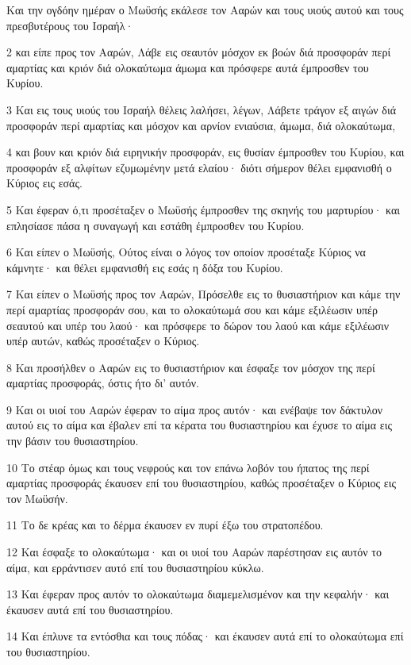 \par Και την ογδόην ημέραν ο Μωϋσής εκάλεσε τον Ααρών και τους υιούς αυτού και τους πρεσβυτέρους του Ισραήλ·
\par 2 και είπε προς τον Ααρών, Λάβε εις σεαυτόν μόσχον εκ βοών διά προσφοράν περί αμαρτίας και κριόν διά ολοκαύτωμα άμωμα και πρόσφερε αυτά έμπροσθεν του Κυρίου.
\par 3 Και εις τους υιούς του Ισραήλ θέλεις λαλήσει, λέγων, Λάβετε τράγον εξ αιγών διά προσφοράν περί αμαρτίας και μόσχον και αρνίον ενιαύσια, άμωμα, διά ολοκαύτωμα,
\par 4 και βουν και κριόν διά ειρηνικήν προσφοράν, εις θυσίαν έμπροσθεν του Κυρίου, και προσφοράν εξ αλφίτων εζυμωμένην μετά ελαίου· διότι σήμερον θέλει εμφανισθή ο Κύριος εις εσάς.
\par 5 Και έφεραν ό,τι προσέταξεν ο Μωϋσής έμπροσθεν της σκηνής του μαρτυρίου· και επλησίασε πάσα η συναγωγή και εστάθη έμπροσθεν του Κυρίου.
\par 6 Και είπεν ο Μωϋσής, Ούτος είναι ο λόγος τον οποίον προσέταξε Κύριος να κάμνητε· και θέλει εμφανισθή εις εσάς η δόξα του Κυρίου.
\par 7 Και είπεν ο Μωϋσής προς τον Ααρών, Πρόσελθε εις το θυσιαστήριον και κάμε την περί αμαρτίας προσφοράν σου, και το ολοκαύτωμά σου και κάμε εξιλέωσιν υπέρ σεαυτού και υπέρ του λαού· και πρόσφερε το δώρον του λαού και κάμε εξιλέωσιν υπέρ αυτών, καθώς προσέταξεν ο Κύριος.
\par 8 Και προσήλθεν ο Ααρών εις το θυσιαστήριον και έσφαξε τον μόσχον της περί αμαρτίας προσφοράς, όστις ήτο δι' αυτόν.
\par 9 Και οι υιοί του Ααρών έφεραν το αίμα προς αυτόν· και ενέβαψε τον δάκτυλον αυτού εις το αίμα και έβαλεν επί τα κέρατα του θυσιαστηρίου και έχυσε το αίμα εις την βάσιν του θυσιαστηρίου.
\par 10 Το στέαρ όμως και τους νεφρούς και τον επάνω λοβόν του ήπατος της περί αμαρτίας προσφοράς έκαυσεν επί του θυσιαστηρίου, καθώς προσέταξεν ο Κύριος εις τον Μωϋσήν.
\par 11 Το δε κρέας και το δέρμα έκαυσεν εν πυρί έξω του στρατοπέδου.
\par 12 Και έσφαξε το ολοκαύτωμα· και οι υιοί του Ααρών παρέστησαν εις αυτόν το αίμα, και ερράντισεν αυτό επί του θυσιαστηρίου κύκλω.
\par 13 Και έφεραν προς αυτόν το ολοκαύτωμα διαμεμελισμένον και την κεφαλήν· και έκαυσεν αυτά επί του θυσιαστηρίου.
\par 14 Και έπλυνε τα εντόσθια και τους πόδας· και έκαυσεν αυτά επί το ολοκαύτωμα επί του θυσιαστηρίου.
